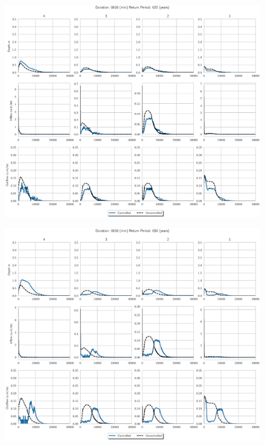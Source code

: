 \begin{figure}
    \centering
    \includegraphics[width=\linewidth]{./RL-SI-figures/77storms/0010025.eps}
\end{figure}
\begin{figure}
    \centering
    \includegraphics[width=\linewidth]{./RL-SI-figures/77storms/0010050.eps}
\end{figure}
